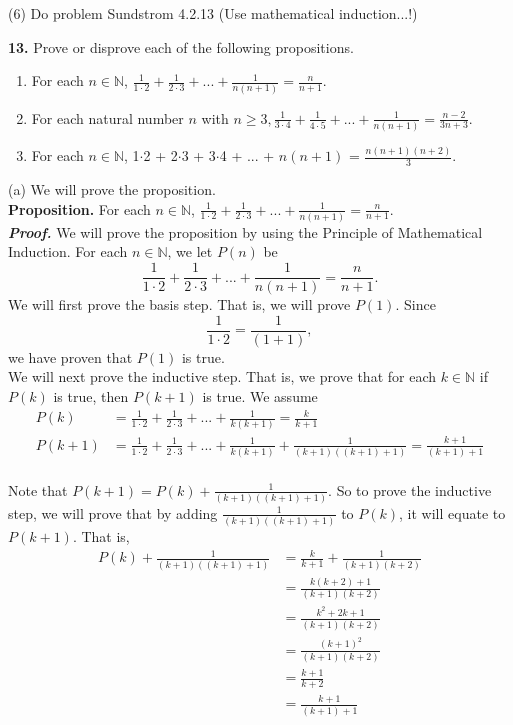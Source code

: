 \documentclass{article}
\begin{document}
(6) Do problem Sundstrom 4.2.13 (Use mathematical induction...!)

\textbf{13.} Prove or disprove each of the following propositions.

\begin{enumerate}[leftmargin=35px,label=(\textbf{\alph*})]
\item For each $n \in \mathbb{N}$, $\frac{1}{1 \cdot 2} + \frac{1}{2 \cdot 3} + ... + \frac{1}{n(n + 1)} = \frac{n}{n + 1}$.


\item For each natural number $n$ with $n \geq 3, \frac{1}{3 \cdot 4} + \frac{1}{4 \cdot 5} + ... + \frac{1}{n(n + 1)} = \frac{n - 2}{3n + 3}$.

\item For each $n \in \mathbb{N}$, 1$\cdot$2 + 2$\cdot$3 + 3$\cdot$4 + ... + $n(n + 1)$ = $\frac{n(n + 1)(n + 2)}{3}$.
\end{enumerate}

(a) We will prove the proposition.\\
\textbf{Proposition.} For each $n \in \mathbb{N}$, $\frac{1}{1 \cdot 2} + \frac{1}{2 \cdot 3} + ... + \frac{1}{n(n + 1)} = \frac{n}{n + 1}$.\\
\textit{\textbf{Proof.}} We will prove the proposition by using the Principle of Mathematical Induction. For each $n \in \mathbb{N}$, we let $P(n)$ be
\begin{equation*}
\frac{1}{1 \cdot 2} + \frac{1}{2 \cdot 3} + ... + \frac{1}{n(n + 1)} = \frac{n}{n + 1}.
\end{equation*}
We will first prove the basis step. That is, we will prove $P(1).$ Since 
\begin{equation*}
\frac{1}{1 \cdot 2} = \frac{1}{(1 + 1)},
\end{equation*} we have proven that $P(1)$ is true.\\

We will next prove the inductive step. That is, we prove that for each $k \in \mathbb{N}$ if $P(k)$ is true, then $P(k + 1)$ is true. We assume
\begin{align}
P(k) &= \frac{1}{1 \cdot 2} + \frac{1}{2 \cdot 3} + ... + \frac{1}{k(k + 1)} = \frac{k}{k + 1}\\
P(k + 1) &= \frac{1}{1 \cdot 2} + \frac{1}{2 \cdot 3} + ... + \frac{1}{k(k + 1)} + \frac{1}{(k + 1)((k + 1) + 1)} = \frac{k + 1}{(k + 1) + 1}
\end{align}
\\
Note that $P(k + 1) = P(k) + \frac{1}{(k + 1)((k + 1) + 1)}$. So to prove the inductive step, we will prove that by adding $\frac{1}{(k + 1)((k + 1) + 1)}$ to $P(k)$, it will equate to $P(k + 1)$. That is,
\begin{align*}
P(k) + \frac{1}{(k + 1)((k + 1) + 1)} &= \frac{k}{k + 1} + \frac{1}{(k + 1)(k + 2)}\\
&= \frac{k(k + 2) + 1}{(k + 1)(k + 2)}\\
&= \frac{k^2 + 2k + 1}{(k + 1)(k + 2)}\\
&= \frac{(k + 1)^2}{(k + 1)(k + 2)}\\
&= \frac{k + 1}{k + 2}\\
&= \frac{k + 1}{(k + 1) + 1}
\end{align*}
\end{document}
